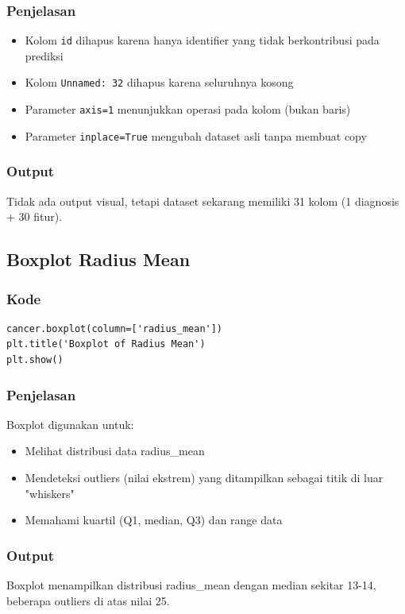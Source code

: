 \documentclass[12pt,a4paper]{article}
\begin{document}
\subsubsection{Penjelasan}
\begin{itemize}
    \item Kolom \texttt{id} dihapus karena hanya identifier yang tidak berkontribusi pada prediksi
    \item Kolom \texttt{Unnamed: 32} dihapus karena seluruhnya kosong
    \item Parameter \texttt{axis=1} menunjukkan operasi pada kolom (bukan baris)
    \item Parameter \texttt{inplace=True} mengubah dataset asli tanpa membuat copy
\end{itemize}

\subsubsection{Output}
Tidak ada output visual, tetapi dataset sekarang memiliki 31 kolom (1 diagnosis + 30 fitur).

\subsection{Boxplot Radius Mean}

\subsubsection{Kode}
\begin{lstlisting}[style=pythonstyle]
cancer.boxplot(column=['radius_mean'])
plt.title('Boxplot of Radius Mean')
plt.show()
\end{lstlisting}

\subsubsection{Penjelasan}
Boxplot digunakan untuk:
\begin{itemize}
    \item Melihat distribusi data radius\_mean
    \item Mendeteksi outliers (nilai ekstrem) yang ditampilkan sebagai titik di luar "whiskers"
    \item Memahami kuartil (Q1, median, Q3) dan range data
\end{itemize}

\subsubsection{Output}
Boxplot menampilkan distribusi radius\_mean dengan median sekitar 13-14, beberapa outliers di atas nilai 25.
\end{document}
